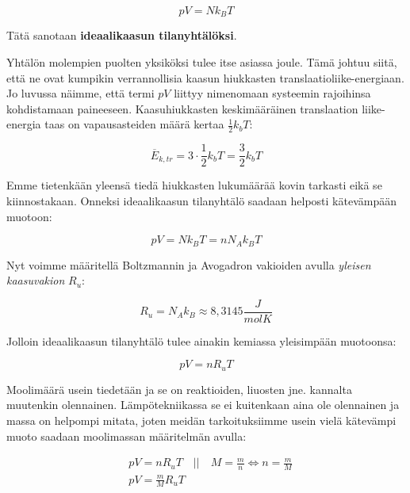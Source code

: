 \documentclass[12pt,a4paper,finnish]{book}
\begin{document}
\begin{equation}
 pV = Nk_BT
\end{equation}

Tätä sanotaan \textbf{ideaalikaasun tilanyhtälöksi}.

Yhtälön molempien puolten yksiköksi tulee itse asiassa joule. Tämä johtuu siitä, että ne ovat 
kumpikin verrannollisia kaasun hiukkasten translaatioliike-energiaan. Jo luvussa  
näimme, että termi $pV$ liittyy nimenomaan systeemin rajoihinsa kohdistamaan paineeseen. Kaasuhiukkasten 
keskimääräinen translaation liike-energia taas on vapausasteiden määrä kertaa $\frac{1}{2}k_bT$:

\begin{equation}
 \overline{E}_{k,tr} = 3\cdot \frac{1}{2}k_bT = \frac{3}{2}k_bT
\end{equation}

Emme tietenkään yleensä tiedä hiukkasten lukumäärää kovin tarkasti eikä se kiinnostakaan. Onneksi 
ideaalikaasun tilanyhtälö saadaan helposti kätevämpään muotoon:

\begin{equation}
 pV = Nk_BT = nN_Ak_BT
\end{equation}

Nyt voimme määritellä Boltzmannin ja Avogadron vakioiden avulla \textit{yleisen kaasuvakion} $R_u$:

\begin{equation}
 R_u = N_Ak_B \approx 8,3145 \frac{J}{molK}
\end{equation}

Jolloin ideaalikaasun tilanyhtälö tulee ainakin kemiassa yleisimpään muotoonsa:

\begin{framed}
\begin{equation}
 pV = nR_uT
\end{equation}
\end{framed}

Moolimäärä usein tiedetään ja se on reaktioiden, liuosten jne. kannalta muutenkin olennainen.
Lämpötekniikassa se ei kuitenkaan aina ole olennainen ja massa on helpompi mitata, joten 
meidän tarkoituksiimme usein vielä kätevämpi muoto saadaan moolimassan määritelmän avulla:

\begin{align}
 &pV = nR_uT \quad \bigg|\bigg| \quad M = \frac{m}{n} \Leftrightarrow n = \frac{m}{M}\\
 &pV = \frac{m}{M}R_uT
\end{align}
\end{document}

